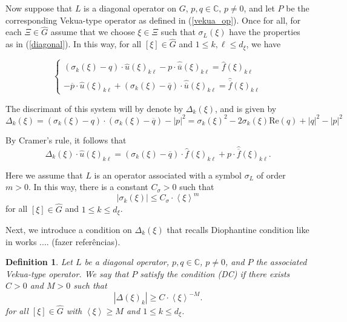 \documentclass[sn-mathphys-num]{sn-jnl}%
\numberwithin{equation}{section}
\theoremstyle{thmstyleone}
\theoremstyle{thmstyletwo}
\theoremstyle{thmstylethree}
\newtheorem{definition}{Definition}[section]
\renewcommand{\Re}{\textrm{Re}}
\def\jp#1{{\left\langle{#1}\right\rangle}}
\begin{document}
Now suppose that $L$ is a diagonal operator on $G$, $p,q \in \mathbb{C}$, $p \neq 0$, and let $P$ be the corresponding Vekua-type operator as defined in (\ref{vekua_op}). Once for all, for each $\Xi \in \widehat{G}$ assume that we choose $\xi \in \Xi$ such that $\sigma_L(\xi)$ have the properties as in (\ref{diagonal}). In this way, for all $[\xi] \in \widehat{G}$ and $1 \leq k,\ell \leq d_\xi$, we have
 
\begin{equation}\label{subsystem}
	\left \{ \begin{array}{c} (\sigma_k(\xi)-q)\cdot \widehat{u}(\xi)_{k\ell}-p \cdot \widehat{\overline{u}}(\xi)_{k\ell}=\widehat{f}(\xi)_{k\ell} \\ -\overline{p} \cdot \widehat{u}(\xi)_{k\ell} + (\sigma_k(\xi)-\overline{q} ) \cdot \widehat{ \overline{u}}(\xi)_{k\ell} = \widehat{\overline{f}}(\xi)_{k\ell}   \end{array}   \right.
\end{equation}

The discrimant of this system will by denote by $\Delta_k(\xi)$, and is given by
\begin{equation}\label{discriminant} 
\Delta_k(\xi)=(\sigma_k(\xi)-q)\cdot (\sigma_k(\xi)-\overline{q})-|p|^2=\sigma_k(\xi)^2-2\sigma_k(\xi)\Re(q)+|q|^2-|p|^2
\end{equation} 

By Cramer's rule, it follows that
\begin{equation}\label{cramer}
\Delta_k(\xi) \cdot \widehat{u}(\xi)_{k\ell} =(\sigma_k(\xi)-\overline{q})\cdot \widehat{f}(\xi)_{k\ell} +p \cdot \widehat{\overline{f}}(\xi)_{k\ell}. 
\end{equation}

Here we assume that $L$ is an operator associated with a symbol $\sigma_L$ of order $m>0$. In this way, there is a constant $C_\sigma>0$ such that
$$|\sigma_k(\xi)| \leq C_\sigma \cdot \jp{\xi}^m$$
for all $[\xi] \in \widehat{G}$ and $1 \leq k \leq d_\xi$.

Next, we introduce a condition on $\Delta_k(\xi)$ that recalls Diophantine condition like in works .... (fazer referências).

\begin{definition}\label{DC} Let $L$ be a diagonal operator, $p,q \in \mathbb{C}$, $p \neq 0$, and $P$ the associated Vekua-type operator. We say that $P$ satisfy the condition (DC) if there exists $C>0$ and $M>0$ such that
	$$|\Delta(\xi)_k| \geq C \cdot \jp{\xi}^{-M}.$$
for all $[\xi] \in \widehat{G}$ with $\jp{\xi} \geq M$ and $1\leq k \leq d_\xi$. 
\end{definition}
\end{document}
